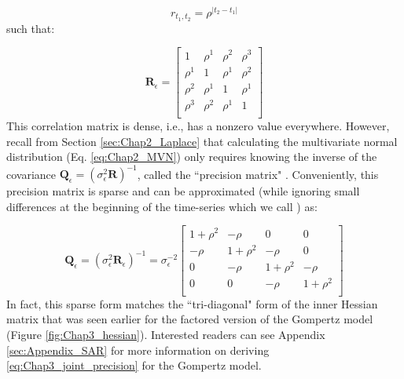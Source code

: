 \begin{equation}
    r_{t_1,t_2} = \rho^{|t_2-t_1|}
\end{equation}
such that:

\begin{equation} \label{eq:Chap3_joint_correlation}
    \mathbf{R}_{\epsilon} = \begin{bmatrix}
    1 & \rho^1 & \rho^2 & \rho^3 \\
    \rho^1 & 1 & \rho^1 & \rho^2 \\
    \rho^2 & \rho^1 & 1 & \rho^1 \\
    \rho^3 & \rho^2 & \rho^1 & 1\\
    \end{bmatrix} 
\end{equation}
This correlation matrix is dense, i.e., has a nonzero value everywhere.  However, recall from Section \ref{sec:Chap2_Laplace} that calculating the multivariate normal distribution (Eq. \ref{eq:Chap2_MVN}) only requires knowing the inverse of the covariance \( \mathbf{Q}_{\epsilon} = (\sigma_{\epsilon}^2 \mathbf{R})^{-1} \), called the ``precision matrix" \cite{rue_gaussian_2005}.  Conveniently, this precision matrix is sparse and can be approximated (while ignoring small differences at the beginning of the time-series which we call ) as:

\begin{equation} \label{eq:Chap3_joint_precision}
    \mathbf{Q}_{\epsilon} = (\sigma_{\epsilon}^2 \mathbf{R}_{\epsilon})^{-1} = \sigma_{\epsilon}^{-2} \begin{bmatrix}
    1+\rho^2 & -\rho & 0 & 0 \\
    -\rho & 1+\rho^2 & -\rho & 0 \\
    0 & -\rho & 1+\rho^2 & -\rho \\
    0 & 0 & -\rho & 1+\rho^2 \\
    \end{bmatrix}
\end{equation}
In fact, this sparse form matches the ``tri-diagonal" form of the inner Hessian matrix that was seen earlier for the factored version of the Gompertz model (Figure \ref{fig:Chap3_hessian}).  Interested readers can see Appendix \ref{sec:Appendix_SAR} for more information on deriving \ref{eq:Chap3_joint_precision} for the Gompertz model.

\lstset{style=TMBcode}


